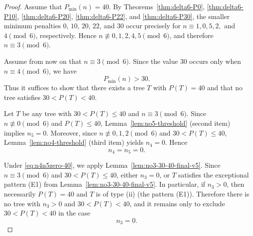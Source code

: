 \documentclass[preprint,12pt]{elsarticle}
\begin{document}
\begin{proof}
Assume that $P_{\min}(n)=40$.
By Theorems~\ref{thm:delta6-P0}, \ref{thm:delta6-P10},
\ref{thm:delta6-P20}, \ref{thm:delta6-P22}, and \ref{thm:delta6-P30},
the smaller minimum penalties $0$, $10$, $20$, $22$, and $30$ occur precisely for
$n\equiv 1,0,5,2,$ and $4\pmod 6$, respectively.
Hence $n\not\equiv 0,1,2,4,5\pmod 6$, and therefore $n\equiv 3\pmod 6$.

\medskip
Assume from now on that $n\equiv 3\pmod 6$.
Since the value $30$ occurs only when $n\equiv 4\pmod 6$, we have
\begin{equation}
P_{\min}(n)>30.
\label{eq:Pgt30}
\end{equation}
Thus it suffices to show that there exists a tree $T$ with $P(T)=40$ and that
no tree satisfies $30<P(T)<40$.

\medskip
Let $T$ be any tree with $30<P(T)\le 40$ and $n\equiv 3\pmod 6$.
Since $n\not\equiv 0\pmod 6$ and $P(T)\le 40$,
Lemma~\ref{lem:no5-threshold} (second item) implies $n_5=0$.
Moreover, since $n\not\equiv 0,1,2\pmod 6$ and $30<P(T)\le 40$,
Lemma~\ref{lem:no4-threshold} (third item) yields $n_4=0$.
Hence
\begin{equation}
n_4=n_5=0.
\label{eq:n4n5zero-40}
\end{equation}

Under \eqref{eq:n4n5zero-40}, we apply Lemma~\ref{lem:no3-30-40-final-v5}.
Since $n\equiv 3\pmod 6$ and $30<P(T)\le 40$, either $n_3=0$, or $T$ satisfies the
exceptional pattern \textup{(E1)} from Lemma~\ref{lem:no3-30-40-final-v5}.
In particular, if $n_3>0$, then necessarily $P(T)=40$ and $T$ is of type
\textup{(ii)} (the pattern \textup{(E1)}).
Therefore there is no tree with $n_3>0$ and $30<P(T)<40$, and it remains only to
exclude $30<P(T)<40$ in the case
\begin{equation}
n_3=0.
\label{eq:n3zero-40}
\end{equation}


\end{proof}
\end{document}
